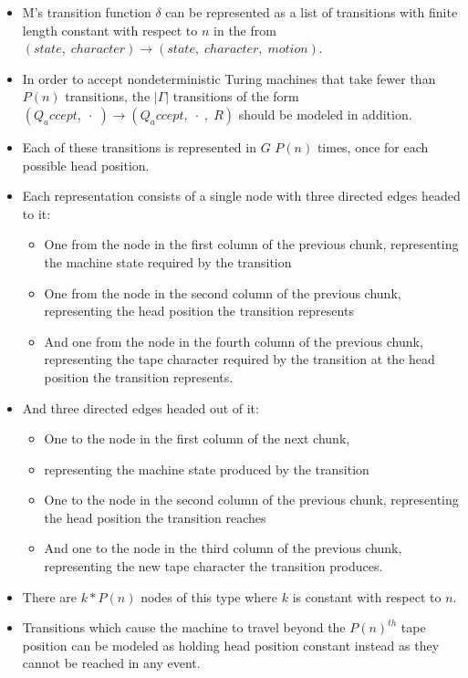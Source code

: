 \documentclass[12pt]{article}
\begin{document}
\begin{itemize}
  \item M's transition function $\delta$ can be represented as a list of transitions with finite length constant with respect to $n$ in the from $(state,\;character) \rightarrow (state,\;character,\;motion)$.
  \item In order to accept nondeterministic Turing machines that take fewer than $P(n)$ transitions, the $|\Gamma|$ transitions of the form $(Q_accept, \;\cdot\;) \rightarrow (Q_accept,\;\cdot\;,\;R)$ should be modeled in addition.
  \item Each of these transitions is represented in $G$ $P(n)$ times, once for each possible head position.
  \item Each representation consists of a single node with three directed edges headed to it:
  \begin{itemize}
	  \item One from the node in the first column of the previous chunk, representing the machine state required by the transition
    \item One from the node in the second column of the previous chunk, representing the head position the transition represents
    \item And one from the node in the fourth column of the previous chunk, representing the tape character required by the transition at the head position the transition represents.
  \end{itemize}
	\item And three directed edges headed out of it:
  \begin{itemize}
		\item One to the node in the first column of the next chunk, \item representing the machine state produced by the transition
		\item One to the node in the second column of the previous chunk, representing the head position the transition reaches
		\item And one to the node in the third column of the previous chunk, representing the new tape character the transition produces.
  \end{itemize}
	\item There are $k*P(n)$ nodes of this type where $k$ is constant with respect to $n$.
	\item Transitions which cause the machine to travel beyond the $P(n)^{th}$ tape position can be modeled as holding head position constant instead as they cannot be reached in any event.
\end{itemize}
\end{document}

